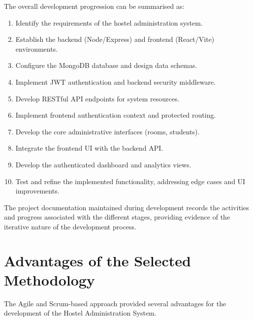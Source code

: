 The overall development progression can be summarised as:

\begin{enumerate}
    \item Identify the requirements of the hostel administration system.
    \item Establish the backend (Node/Express) and frontend (React/Vite) environments.
    \item Configure the MongoDB database and design data schemas.
    \item Implement JWT authentication and backend security middleware.
    \item Develop RESTful API endpoints for system resources.
    \item Implement frontend authentication context and protected routing.
    \item Develop the core administrative interfaces (rooms, students).
    \item Integrate the frontend UI with the backend API.
    \item Develop the authenticated dashboard and analytics views.
    \item Test and refine the implemented functionality, addressing edge cases and UI improvements.
\end{enumerate}

The project documentation maintained during development records the activities and progress associated with the different stages, providing evidence of the iterative nature of the development process.

\section{Advantages of the Selected Methodology}

The Agile and Scrum-based approach provided several advantages for the development of the Hostel Administration System.

